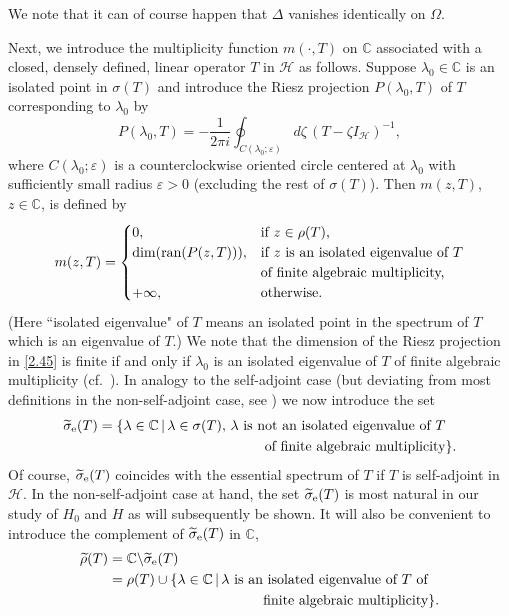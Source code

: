 \documentclass[reqno,10pt, centertags]{amsart}
\newcounter{count}
\newcommand{\bbC}{{\mathbb{C}}}
\newcommand{\cH}{{\mathcal H}}
\newcommand{\no}{\nonumber}
\newcommand{\lb}{\label}
\newcommand{\f}{\frac}
\newcommand{\wti}{\widetilde}
\newcommand{\ran}{\text{\rm{ran}}}
\numberwithin{equation}{section}
\theoremstyle{definition}
\begin{document}
We note that it can of course happen that $\Delta$ vanishes
identically on $\Omega$.

Next, we introduce the multiplicity function $m(\cdot,T)$ on
$\bbC$ associated with a closed, densely defined, linear operator
$T$ in $\cH$ as follows. Suppose $\lambda_0\in\bbC$ is an isolated
point in $\sigma(T)$ and introduce the Riesz projection
$P(\lambda_0,T)$ of $T$ corresponding to $\lambda_0$ by
\begin{equation}
P(\lambda_0,T)=-\f{1}{2\pi i}\oint_{C(\lambda_0; \varepsilon) }
d\zeta \, (T-\zeta I_{\cH})^{-1}, \lb{2.45}
\end{equation}
where $C(\lambda_0; \varepsilon) $ is a counterclockwise oriented
circle centered at $\lambda_0$ with sufficiently small radius
$\varepsilon>0$ (excluding the rest of $\sigma(T)$). Then
$m(z,T)$, $z\in\bbC$, is defined by
\begin{equation}
m(z,T)=\begin{cases} 0, & \text{if $z\in\rho(T)$,} \\
\dim(\ran(P(z,T))), & \text{if $z$ is an isolated eigenvalue of
$T$} \\
& \text{of finite algebraic multiplicity,} \\
+\infty, & \text{otherwise.} \end{cases} \lb{2.46}
\end{equation}
(Here ``isolated eigenvalue" of $T$ means an isolated point in the spectrum 
of $T$ which is an eigenvalue of $T$.)  
We note that the dimension of the Riesz projection in \eqref{2.45} is
finite if and only if $\lambda_0$ is an isolated eigenvalue of $T$ of
finite algebraic multiplicity (cf.\ \cite[p.\ 181]{Ka80}). In analogy
to the self-adjoint case (but deviating from most definitions in the
non-self-adjoint case, see \cite[Sect.\ I.4, Ch.\ IX]{EE89}) we now
introduce the set 
\begin{align}
\begin{split}
\wti \sigma_{\rm e}(T)&=\{\lambda\in\bbC\, | \, \lambda\in\sigma(T),
\, \text{$\lambda$ is not an isolated eigenvalue of $T$}   \\
& \hspace*{4.2cm} \text{of finite algebraic multiplicity}\}. \lb{2.47}
\end{split}
\end{align}
Of course, $\wti \sigma_{\rm e}(T)$ coincides with the essential
spectrum of $T$ if $T$ is self-adjoint in $\cH$. In the
non-self-adjoint case at hand, the set $\wti \sigma_{\rm e}(T)$ is
most natural in our study of $H_0$ and $H$ as will
subsequently be shown. It will also be convenient to introduce the
complement of $\wti \sigma_{\rm e}(T)$ in $\bbC$,
\begin{align}
\wti \rho (T)&=\bbC\backslash\wti\sigma_{\rm e}(T)    \no \\
&=\rho(T)\cup\{\lambda\in\bbC\,|\, \text{$\lambda$ is an isolated 
eigenvalue of $T$ of}     \lb{2.48A}  \\
&\hspace*{3.9cm} \text{finite algebraic multiplicity}\}.  \no
\end{align}
\end{document}
